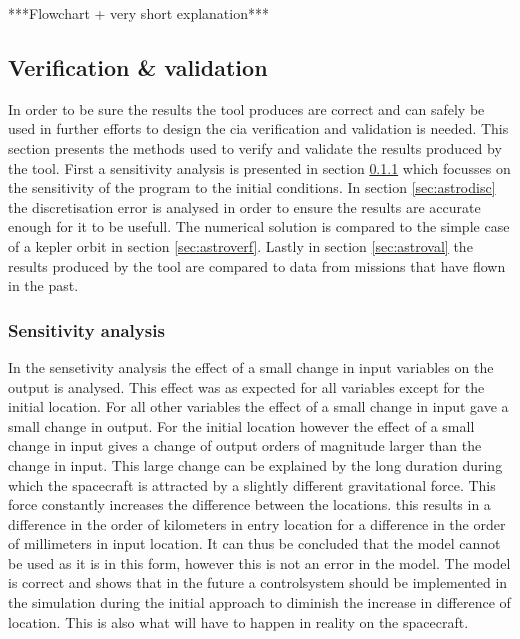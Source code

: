 ***Flowchart + very short explanation***\\

\subsection{Verification \& validation}
\label{sec:astrovv}

In order to be sure the results the tool produces are correct and can safely be used in further efforts to design the \gls{cia} verification and validation is needed. This section presents the methods used to verify and validate the results produced by the tool. First a sensitivity analysis is presented in section \ref{sec:astrosens} which focusses on the sensitivity of the program to the initial conditions. In section \ref{sec:astrodisc} the discretisation error is analysed in order to ensure the results are accurate enough for it to be usefull. The numerical solution is compared to the simple case of a kepler orbit in section \ref{sec:astroverf}. Lastly in section \ref{sec:astroval} the results produced by the tool are compared to data from missions that have flown in the past.

\subsubsection{Sensitivity analysis}
\label{sec:astrosens}

In the sensetivity analysis the effect of a small change in input variables on the output is analysed. This effect was as expected for all variables except for the initial location. For all other variables the effect of a small change in input gave a small change in output. For the initial location however the effect of a small change in input gives a change of output orders of magnitude larger than the change in input. This large change can be explained by the long duration during which the spacecraft is attracted by a slightly different gravitational force. This force constantly increases the difference between the locations. this results in a difference in the order of kilometers in entry location for a difference in the order of millimeters in input location. It can thus be concluded that the model cannot be used as it is in this form, however this is not an error in the model. The model is correct and shows that in the future a controlsystem should be implemented in the simulation during the initial approach to diminish the increase in difference of location. This is also what will have to happen in reality on the spacecraft.


